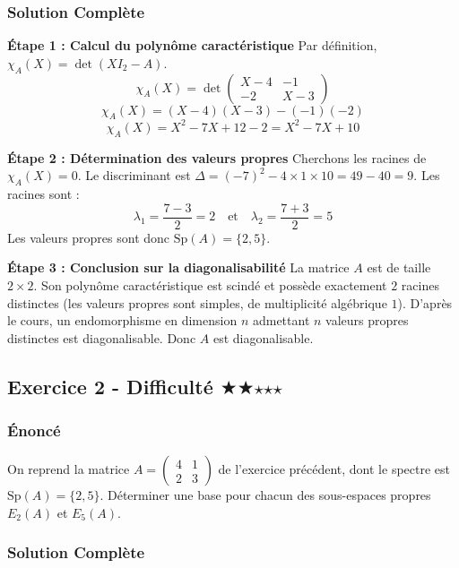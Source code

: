\documentclass[11pt,a4paper]{article}
\begin{document}
\subsubsection*{Solution Complète}

\textbf{Étape 1 : Calcul du polynôme caractéristique}
Par définition, $\chi_A(X) = \det(X I_2 - A)$.
$$\chi_A(X) = \det\begin{pmatrix} X - 4 & -1 \\ -2 & X - 3 \end{pmatrix}$$
$$\chi_A(X) = (X-4)(X-3) - (-1)(-2)$$
$$\chi_A(X) = X^2 - 7X + 12 - 2 = X^2 - 7X + 10$$

\textbf{Étape 2 : Détermination des valeurs propres}
Cherchons les racines de $\chi_A(X) = 0$.
Le discriminant est $\Delta = (-7)^2 - 4 \times 1 \times 10 = 49 - 40 = 9$.
Les racines sont :
$$\lambda_1 = \frac{7 - 3}{2} = 2 \quad \text{et} \quad \lambda_2 = \frac{7 + 3}{2} = 5$$
Les valeurs propres sont donc $\text{Sp}(A) = \{2, 5\}$.

\textbf{Étape 3 : Conclusion sur la diagonalisabilité}
La matrice $A$ est de taille $2 \times 2$. Son polynôme caractéristique est scindé et possède exactement $2$ racines distinctes (les valeurs propres sont simples, de multiplicité algébrique $1$).
D'après le cours, un endomorphisme en dimension $n$ admettant $n$ valeurs propres distinctes est diagonalisable. Donc $A$ est diagonalisable.


\subsection*{Exercice 2 - Difficulté \quad $\bigstar$$\bigstar$$\star$$\star$$\star$}

\subsubsection*{Énoncé}
On reprend la matrice $A = \begin{pmatrix} 4 & 1 \\ 2 & 3 \end{pmatrix}$ de l'exercice précédent, dont le spectre est $\text{Sp}(A) = \{2, 5\}$.
Déterminer une base pour chacun des sous-espaces propres $E_2(A)$ et $E_5(A)$.

\subsubsection*{Solution Complète}
\end{document}
